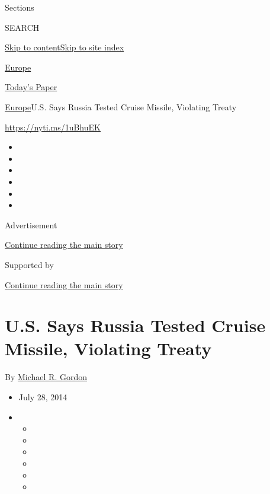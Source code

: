 Sections

SEARCH

\protect\hyperlink{site-content}{Skip to
content}\protect\hyperlink{site-index}{Skip to site index}

\href{https://www.nytimes.com/section/world/europe}{Europe}

\href{https://myaccount.nytimes.com/auth/login?response_type=cookie\&client_id=vi}{}

\href{https://www.nytimes.com/section/todayspaper}{Today's Paper}

\href{/section/world/europe}{Europe}\textbar{}U.S. Says Russia Tested
Cruise Missile, Violating Treaty

\url{https://nyti.ms/1uBhuEK}

\begin{itemize}
\item
\item
\item
\item
\item
\item
\end{itemize}

Advertisement

\protect\hyperlink{after-top}{Continue reading the main story}

Supported by

\protect\hyperlink{after-sponsor}{Continue reading the main story}

\hypertarget{us-says-russia-tested-cruise-missile-violating-treaty}{%
\section{U.S. Says Russia Tested Cruise Missile, Violating
Treaty}\label{us-says-russia-tested-cruise-missile-violating-treaty}}

By \href{http://www.nytimes.com/by/michael-r-gordon}{Michael R. Gordon}

\begin{itemize}
\item
  July 28, 2014
\item
  \begin{itemize}
  \item
  \item
  \item
  \item
  \item
  \item
  \end{itemize}
\end{itemize}

